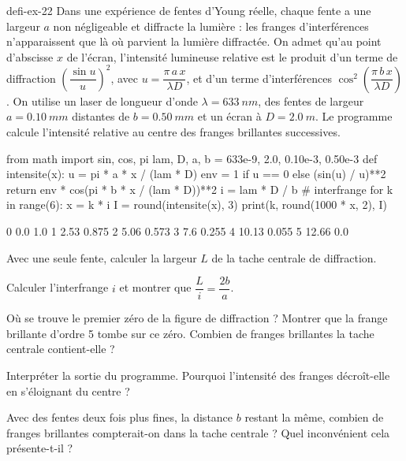 \begin{blocEdition}{defi-ex-22}
Dans une expérience de fentes d'Young réelle, chaque fente a une largeur $a$ non négligeable et diffracte la lumière :
les franges d'interférences n'apparaissent que là où parvient la lumière diffractée. On admet qu'au point d'abscisse $x$
de l'écran, l'intensité lumineuse relative est le produit d'un terme de diffraction $\left(\dfrac{\sin u}{u}\right)^2$, avec
$u=\dfrac{\pi\,a\,x}{\lambda D}$, et d'un terme d'interférences $\cos^2\left(\dfrac{\pi\,b\,x}{\lambda D}\right)$. On utilise un laser de
longueur d'onde $\lambda=\qty{633}{nm}$, des fentes de largeur $a=\qty{0,10}{mm}$ distantes de $b=\qty{0,50}{mm}$ et un écran à
$D=\qty{2,0}{m}$. Le programme calcule l'intensité relative au centre des franges brillantes successives.
\begin{codecote}[0.7]
\begin{pythoncol}
from math import sin, cos, pi
lam, D, a, b = 633e-9, 2.0, 0.10e-3, 0.50e-3
def intensite(x):
    u = pi * a * x / (lam * D)
    env = 1 if u == 0 else (sin(u) / u)**2
    return env * cos(pi * b * x / (lam * D))**2
i = lam * D / b                  # interfrange
for k in range(6):
    x = k * i
    I = round(intensite(x), 3)
    print(k, round(1000 * x, 2), I)
\end{pythoncol}
\cote
\begin{consolecol}
0 0.0 1.0
1 2.53 0.875
2 5.06 0.573
3 7.6 0.255
4 10.13 0.055
5 12.66 0.0
\end{consolecol}
\end{codecote}
\par\smallskip
\begin{questions}
\item Avec une seule fente, calculer la largeur $L$ de la tache centrale de diffraction.
\item Calculer l'interfrange $i$ et montrer que $\dfrac{L}{i}=\dfrac{2b}{a}$.
\item Où se trouve le premier zéro de la figure de diffraction ? Montrer que la frange brillante d'ordre 5 tombe sur ce
zéro. Combien de franges brillantes la tache centrale contient-elle ?
\item Interpréter la sortie du programme. Pourquoi l'intensité des franges décroît-elle en s'éloignant du centre ?
\item Avec des fentes deux fois plus fines, la distance $b$ restant la même, combien de franges brillantes compterait-on
dans la tache centrale ? Quel inconvénient cela présente-t-il ?
\end{questions}
\end{blocEdition}

